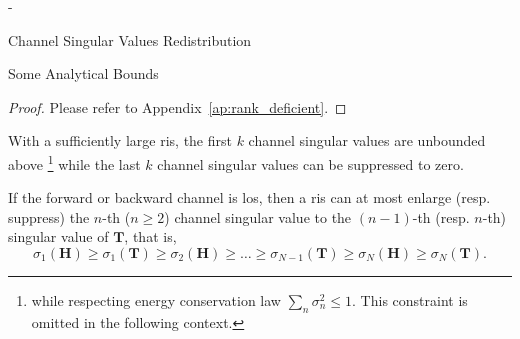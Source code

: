 \begin{section}{-}
\begin{subsection}{Channel Singular Values Redistribution}
\begin{subsubsection}{Some Analytical Bounds}
\begin{proposition}
			\end{proposition}
			\begin{proof}
				Please refer to Appendix~\ref{ap:rank_deficient}.
			\end{proof}


			\begin{corollary}
				With a sufficiently large \gls{ris}, the first $k$ channel singular values are unbounded above \footnote{\textellipsis while respecting energy conservation law $\sum_n \sigma_n^2 \le 1$. This constraint is omitted in the following context.} while the last $k$ channel singular values can be suppressed to zero.
			\end{corollary}

			\begin{corollary}
				If the forward or backward channel is \gls{los}, then a \gls{ris} can at most enlarge (resp. suppress) the $n$-th ($n \ge 2$) channel singular value to the $(n-1)$-th (resp. $n$-th) singular value of $\mathbf{T}$, that is,
				\begin{equation}
					\sigma_1(\mathbf{H}) \ge \sigma_1(\mathbf{T}) \ge {\sigma_2(\mathbf{H})} \ge \ldots \ge \sigma_{N-1}(\mathbf{T}) \ge {\sigma_N(\mathbf{H})} \ge \sigma_N(\mathbf{T}).
					\label{iq:sv_bound_los}
				\end{equation}
			\end{corollary}


\end{subsubsection}
\end{subsection}
\end{section}
